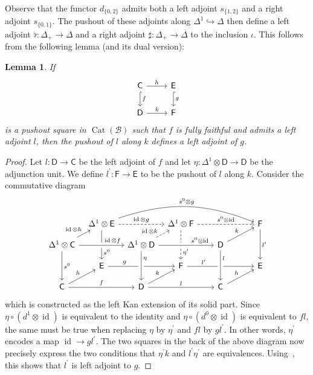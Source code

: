 \documentclass[reqno]{amsart}
\numberwithin{equation}{subsection}
\theoremstyle{plain}
\newtheorem{lemma}[equation]{Lemma}
\theoremstyle{definition}
\let\scr=\mathcal
\let\into=\hookrightarrow
\def\BB{\scr B}
\DeclareMathOperator{\id}{id}
\DeclareMathOperator{\Cat}{Cat}
\newcommand{\I}[1]{\mathsf{#1}}
\begin{document}
Observe that the functor $d_{\{0,2\}}$ admits both a left adjoint $s_{\{1,2\}}$ and a right adjoint $s_{\{0,1\}}$. The pushout of these adjoints along $\Delta^1\into\Delta$ then define a left adjoint $\flat\colon \Delta_+\to\Delta$ and a right adjoint $\sharp\colon\Delta_+\to\Delta$ to the inclusion $\iota$. This follows from the following lemma (and its dual version):
\begin{lemma}
If
\begin{equation*}
\begin{tikzcd}
	\I{C}\arrow[d, hookrightarrow, "f"] \arrow[r, "h"] & \I{E}\arrow[d, "g", hookrightarrow]\\
	\I{D}\arrow[r, "k"] & \I{F}
\end{tikzcd}
\end{equation*}
is a pushout square in $\Cat(\BB)$ such that $f$ is fully faithful and admits a left adjoint $l$, then the pushout of $l$ along $k$ defines a left adjoint of $g$.
\end{lemma}
\begin{proof}
Let $l\colon \I{D}\to\I{C}$ be the left adjoint of $f$ and let $\eta\colon \Delta^1\otimes \I{D}\to\I{D}$ be the adjunction unit. We define $l^\prime\colon \I{F}\to\I{E}$ to be the pushout of $l$ along $k$. Consider the commutative diagram
\begin{equation*}
\begin{tikzcd}[column sep={4.7em,between origins}, row sep={2.5em,between origins}]
& \Delta^1\otimes \I{E}\arrow[rr, dashed, "\id\otimes g"]\arrow[dd, "s^0", near end] \arrow[rrrr, bend left=20, "s^0\otimes g"]&& \Delta^1\otimes\I{F}\arrow[dd, "\eta^\prime", near end, dashed]\arrow[rr, "s^0\otimes\id", dashed] && \I{F}\arrow[dd, "l^\prime"]\\
\Delta^1\otimes\I{C}\arrow[rr, "\id\otimes f", crossing over, near end]\arrow[dd, "s^0"]\arrow[ur, "\id\otimes h"] && \Delta^1\otimes\I{D}\arrow[ur, "\id\otimes k",near start, dashed]\arrow[rr, crossing over, "s^0\otimes\id", near end]&& \I{D}\arrow[ur, "k"]&\\
& \I{E} \arrow[rr, "g", near start]&& \I{F}\arrow[rr, "l^\prime", near start]&& \I{E}\\
\I{C}\arrow[ur, "h"]\arrow[rr, "f"] && \I{D}\arrow[from=uu, crossing over, near start, "\eta"] \arrow[ur, "k"]\arrow[rr, "l"]&&\I{C}\arrow[from=uu, crossing over, "l", near start] \arrow[ur, "h"]&
\end{tikzcd}
\end{equation*}
which is constructed as the left Kan extension of its solid part.
Since $\eta\circ (d^1\otimes \id)$ is equivalent to the identity and $\eta\circ (d^0\otimes \id)$ is equivalent to $fl$, the same must be true when replacing $\eta$ by $\eta^\prime$ and $fl$ by $gl^\prime$. In other words, $\eta^\prime$ encodes a map $\id\to gl^\prime$. The two squares in the back of the above diagram now precisely express the two conditions that $\eta^\prime k$ and $l^\prime\eta^\prime$ are equivalences. Using~\cite[Corollary~3.4.3]{Martini2021a}, this shows that $l^\prime$ is left adjoint to $g$.
\end{proof}
\end{document}
